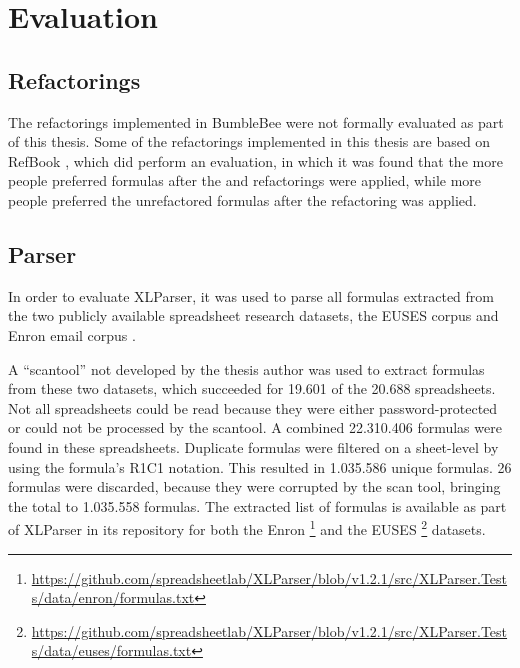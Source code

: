 
\chapter{Evaluation}
\label{chapter:evaluation}

\section{Refactorings}

The refactorings implemented in BumbleBee were not formally evaluated as part of this thesis.
Some of the refactorings implemented in this thesis are based on RefBook \cite{badame2012refactoring}, which did perform an evaluation, in which it was found that the more people preferred formulas after the  and  refactorings were applied, while more people preferred the unrefactored formulas after the  refactoring was applied.


\section{Parser}

In order to evaluate XLParser, it was used to parse all formulas extracted from the two publicly available spreadsheet research datasets, the EUSES corpus \cite{fisher2005euses} and Enron email corpus \cite{klimt2004enron, hermans2015enron}.

A ``scantool'' not developed by the thesis author was used to extract formulas from these two datasets, which succeeded for 19.601 of the 20.688 spreadsheets.
Not all spreadsheets could be read because they were either password-protected or could not be processed by the scantool.
A combined 22.310.406 formulas were found in these spreadsheets.
Duplicate formulas were filtered on a sheet-level by using the formula's R1C1 notation.
This resulted in 1.035.586 unique formulas.
26 formulas were discarded, because they were corrupted by the scan tool, bringing the total to 1.035.558 formulas.
The extracted list of formulas is available as part of XLParser in its repository for both the Enron \footnote{\tiny\url{https://github.com/spreadsheetlab/XLParser/blob/v1.2.1/src/XLParser.Tests/data/enron/formulas.txt}} and the EUSES \footnote{\tiny\url{https://github.com/spreadsheetlab/XLParser/blob/v1.2.1/src/XLParser.Tests/data/euses/formulas.txt}} datasets.

